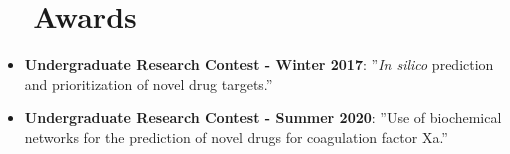 \documentclass[letter,20pt]{article}
\newcommand{\resumeItem}[2]{
  \item\small{
    \textbf{#1}{: #2 \vspace{-2pt}}
  }
}
\newcommand{\resumeItemWithoutTitle}[1]{
  \item\small{
    {\vspace{-2pt}}
  }
}
\newcommand{\resumeSubItem}[2]{\resumeItem{#1}{#2}\vspace{-3pt}}
\newcommand{\resumeSubHeadingListStart}{\begin{itemize}[leftmargin=*]}
\newcommand{\resumeSubHeadingListEnd}{\end{itemize}}
\begin{document}
\section{~~Awards}
\resumeSubHeadingListStart
\resumeSubItem{Undergraduate Research Contest - Winter 2017}{''\textit{In silico} prediction and prioritization of novel drug targets.''}
\resumeSubItem{Undergraduate Research Contest - Summer 2020}{''Use of biochemical networks for the prediction of novel drugs for coagulation factor Xa.''}
\vspace{2pt}
\resumeSubHeadingListEnd
\end{document}

